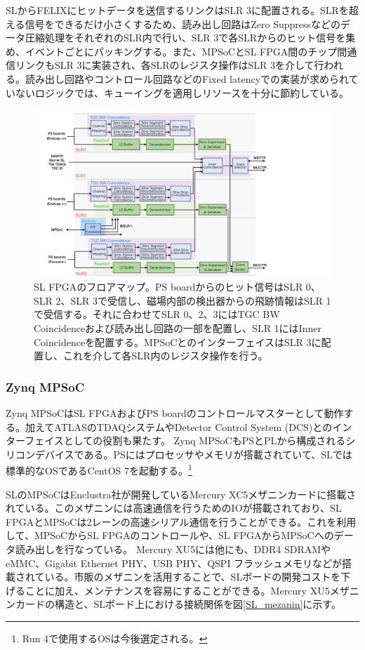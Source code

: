 SLからFELIXにヒットデータを送信するリンクはSLR 3に配置される。SLRを超える信号をできるだけ小さくするため、読み出し回路はZero Suppressなどのデータ圧縮処理をそれぞれのSLR内で行い、SLR 3で各SLRからのヒット信号を集め、イベントごとにパッキングする。また、MPSoCとSL FPGA間のチップ間通信リンクもSLR 3に実装され、各SLRのレジスタ操作はSLR 3を介して行われる。読み出し回路やコントロール回路などのFixed latencyでの実装が求められていないロジックでは、キューイングを適用しリソースを十分に節約している。

\begin{figure} 
\centering
\includegraphics[width=16cm]{fig/Intro/SL_floor.pdf}
\caption[SL FPGAのフロアマップ]{SL FPGAのフロアマップ。PS boardからのヒット信号はSLR 0、SLR 2、SLR 3で受信し、磁場内部の検出器からの飛跡情報はSLR 1で受信する。それに合わせてSLR 0、2、3にはTGC BW Coincidenceおよび読み出し回路の一部を配置し、SLR 1にはInner Coincidenceを配置する。MPSoCとのインターフェイスはSLR 3に配置し、これを介して各SLR内のレジスタ操作を行う。}
\label{SL_floor}
\end{figure}



    \subsubsection{Zynq MPSoC}
Zynq MPSoCはSL FPGAおよびPS boardのコントロールマスターとして動作する。加えてATLASのTDAQシステムやDetector Control System (DCS)とのインターフェイスとしての役割も果たす。
Zynq MPSoCもPSとPLから構成されるシリコンデバイスである。PSにはプロセッサやメモリが搭載されていて、SLでは標準的なOSであるCentOS 7を起動する。\footnote{Run 4で使用するOSは今後選定される。}

SLのMPSoCはEnclustra社が開発しているMercury XC5メザニンカードに搭載されている。このメザニンには高速通信を行うためのIOが搭載されており、SL FPGAとMPSoCは2レーンの高速シリアル通信を行うことができる。これを利用して、MPSoCからSL FPGAのコントロールや、SL FPGAからMPSoCへのデータ読み出しを行なっている。
Mercury XU5には他にも、DDR4 SDRAMやeMMC、Gigabit Ethernet PHY、USB PHY、QSPI フラッシュメモリなどが搭載されている。市販のメザニンを活用することで、SLボードの開発コストを下げることに加え、メンテナンスを容易にすることができる。Mercury XU5メザニンカードの構造と、SLボード上における接続関係を図\ref{SL_mezanin}に示す。


